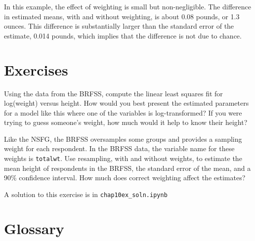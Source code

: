 \documentclass[12pt]{book}
\begin{document}

In this example, the effect of weighting is small but non-negligible.
The difference in estimated means, with and without weighting, is
about 0.08 pounds, or 1.3 ounces.  This difference is substantially
larger than the standard error of the estimate, 0.014 pounds, which
implies that the difference is not due to chance.


\section{Exercises}

\begin{exercise}

Using the data from the BRFSS, compute the linear least squares
fit for log(weight) versus height.
How would you best present the estimated parameters for a model
like this where one of the variables is log-transformed?
If you were trying to guess
someone's weight, how much would it help to know their height?

Like the NSFG, the BRFSS oversamples some groups and provides
a sampling weight for each respondent.  In the BRFSS data, the variable
name for these weights is {\tt totalwt}.
Use resampling, with and without weights, to estimate the mean height
of respondents in the BRFSS, the standard error of the mean, and a
90\% confidence interval.  How much does correct weighting affect the
estimates?

A solution to this exercise is in \verb"chap10ex_soln.ipynb"

\end{exercise}


\section{Glossary}
\end{document}
